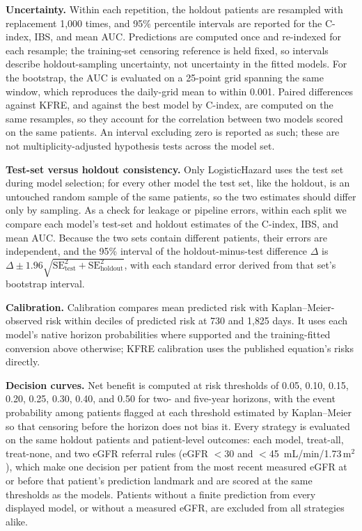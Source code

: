 \documentclass[10pt,letterpaper]{article}
\begin{document}
\textbf{Uncertainty.} Within each repetition, the holdout patients are resampled with replacement 1{,}000 times, and 95\% percentile intervals are reported for the C-index, IBS, and mean AUC. Predictions are computed once and re-indexed for each resample; the training-set censoring reference is held fixed, so intervals describe holdout-sampling uncertainty, not uncertainty in the fitted models. For the bootstrap, the AUC is evaluated on a 25-point grid spanning the same window, which reproduces the daily-grid mean to within 0.001. Paired differences against KFRE, and against the best model by C-index, are computed on the same resamples, so they account for the correlation between two models scored on the same patients. An interval excluding zero is reported as such; these are not multiplicity-adjusted hypothesis tests across the model set.

\textbf{Test-set versus holdout consistency.} Only LogisticHazard uses the test set during model selection; for every other model the test set, like the holdout, is an untouched random sample of the same patients, so the two estimates should differ only by sampling. As a check for leakage or pipeline errors, within each split we compare each model's test-set and holdout estimates of the C-index, IBS, and mean AUC. Because the two sets contain different patients, their errors are independent, and the 95\% interval of the holdout-minus-test difference $\Delta$ is $\Delta \pm 1.96\sqrt{\mathrm{SE}_{\mathrm{test}}^2+\mathrm{SE}_{\mathrm{holdout}}^2}$, with each standard error derived from that set's bootstrap interval.

\textbf{Calibration.} Calibration compares mean predicted risk with Kaplan--Meier-observed risk within deciles of predicted risk at 730 and 1{,}825 days. It uses each model's native horizon probabilities where supported and the training-fitted conversion above otherwise; KFRE calibration uses the published equation's risks directly.

\textbf{Decision curves.} Net benefit \cite{vickers2006decisioncurve} is computed at risk thresholds of 0.05, 0.10, 0.15, 0.20, 0.25, 0.30, 0.40, and 0.50 for two- and five-year horizons, with the event probability among patients flagged at each threshold estimated by Kaplan--Meier so that censoring before the horizon does not bias it. Every strategy is evaluated on the same holdout patients and patient-level outcomes: each model, treat-all, treat-none, and two eGFR referral rules (eGFR $<$30 and $<$45~mL/min/1.73\,m$^2$), which make one decision per patient from the most recent measured eGFR at or before that patient's prediction landmark and are scored at the same thresholds as the models. Patients without a finite prediction from every displayed model, or without a measured eGFR, are excluded from all strategies alike.
\end{document}
